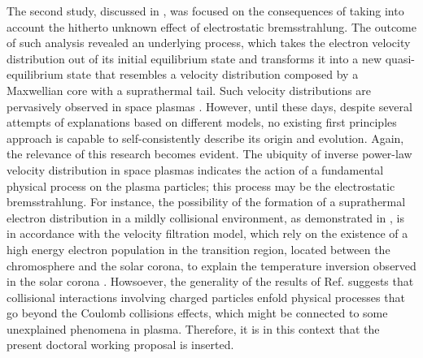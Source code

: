 \documentclass[12pt,a4paper,ruledheader]{report}
\begin{document}
The second study, discussed in , was focused on the
consequences of taking into account the hitherto unknown effect of
electrostatic bremsstrahlung. The outcome of such analysis revealed an
underlying process, which takes the electron velocity distribution
out of its initial equilibrium state and transforms it into a new
quasi-equilibrium state that resembles a velocity distribution composed
by a Maxwellian core with a suprathermal tail. Such velocity distributions
are pervasively observed in space plasmas \cite{Parker1958a,Vasyliunas68,
  Coroniti1974,FABMG75,Lin1998,Horne2005,Clark2015,Padovani2015,deSoria2016,
  Padovani2017,Deca2017}. However, until these
days, despite several attempts of explanations based on different models,
no existing first principles approach is capable to self-consistently
describe its origin and evolution. Again, the relevance of this research
becomes evident. The ubiquity of inverse power-law velocity distribution
in space plasmas indicates the action of a fundamental physical process on
the plasma particles; this process may be the electrostatic bremsstrahlung.
For instance, the possibility of the formation of a suprathermal electron
distribution in a mildly collisional environment, as demonstrated in
\cite{Tigik2017a}, is in accordance with the velocity filtration model,
which rely on the existence of a high energy electron population in the
transition region, located between the chromosphere and the solar corona,
to explain the temperature inversion observed in the solar corona \cite{
  Scudder92a,Scudder92b,Anderson94,Scudder94,Scudder96,DS99,DS03,Teles15}.
Howsoever, the generality of the results of Ref. \cite{Tigik2017a} suggests
that collisional interactions involving charged particles enfold physical
processes that go beyond the Coulomb collisions effects, which might be
connected to some unexplained phenomena in plasma. Therefore, it is in
this context that the present doctoral working proposal is inserted.

\end{document}
